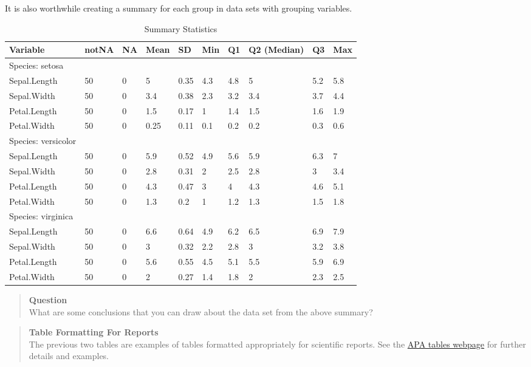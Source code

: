 \documentclass[
]{book}
\begin{document}
It is also worthwhile creating a summary for each group in data sets with grouping variables.

\begin{table}

\caption{\label{tab:unnamed-chunk-5}Summary Statistics}
\centering
\begin{tabular}[t]{llllllllll}
\toprule
Variable & notNA & NA & Mean & SD & Min & Q1 & Q2 (Median) & Q3 & Max\\
\midrule
Species: setosa &  &  &  &  &  &  &  &  & \\
Sepal.Length & 50 & 0 & 5 & 0.35 & 4.3 & 4.8 & 5 & 5.2 & 5.8\\
Sepal.Width & 50 & 0 & 3.4 & 0.38 & 2.3 & 3.2 & 3.4 & 3.7 & 4.4\\
Petal.Length & 50 & 0 & 1.5 & 0.17 & 1 & 1.4 & 1.5 & 1.6 & 1.9\\
Petal.Width & 50 & 0 & 0.25 & 0.11 & 0.1 & 0.2 & 0.2 & 0.3 & 0.6\\
\addlinespace
Species: versicolor &  &  &  &  &  &  &  &  & \\
Sepal.Length & 50 & 0 & 5.9 & 0.52 & 4.9 & 5.6 & 5.9 & 6.3 & 7\\
Sepal.Width & 50 & 0 & 2.8 & 0.31 & 2 & 2.5 & 2.8 & 3 & 3.4\\
Petal.Length & 50 & 0 & 4.3 & 0.47 & 3 & 4 & 4.3 & 4.6 & 5.1\\
Petal.Width & 50 & 0 & 1.3 & 0.2 & 1 & 1.2 & 1.3 & 1.5 & 1.8\\
\addlinespace
Species: virginica &  &  &  &  &  &  &  &  & \\
Sepal.Length & 50 & 0 & 6.6 & 0.64 & 4.9 & 6.2 & 6.5 & 6.9 & 7.9\\
Sepal.Width & 50 & 0 & 3 & 0.32 & 2.2 & 2.8 & 3 & 3.2 & 3.8\\
Petal.Length & 50 & 0 & 5.6 & 0.55 & 4.5 & 5.1 & 5.5 & 5.9 & 6.9\\
Petal.Width & 50 & 0 & 2 & 0.27 & 1.4 & 1.8 & 2 & 2.3 & 2.5\\
\bottomrule
\end{tabular}
\end{table}

\begin{quote}
\textbf{Question}\\
What are some conclusions that you can draw about the data set from the above summary?
\end{quote}

\begin{quote}
\textbf{Table Formatting For Reports}\\
The previous two tables are examples of tables formatted appropriately for scientific reports. See the \href{https://apastyle.apa.org/style-grammar-guidelines/tables-figures/tables}{APA tables webpage} for further details and examples.
\end{quote}
\end{document}
